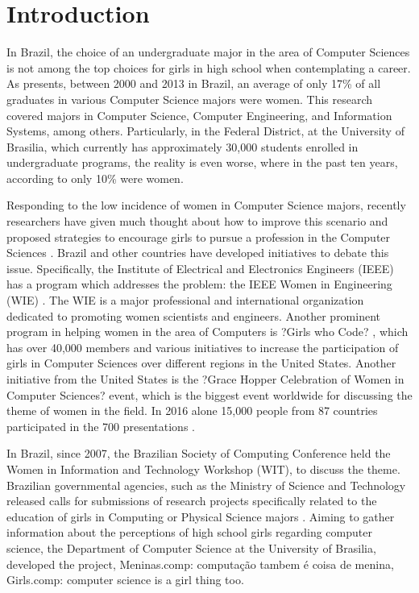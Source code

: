 \section{Introduction}\label{sec:intro}%

In Brazil, the choice of an undergraduate major in the area of Computer Sciences is not among the top choices for girls in high school when contemplating a career. As \cite{maia_2016} presents, between 2000 and 2013 in Brazil, an average of only 17\% of all graduates in various Computer Science majors were women. This research covered majors in Computer Science, Computer Engineering, and Information Systems, among others. Particularly, in the Federal District, at the University of Brasilia, which currently has approximately 30,000 students enrolled in undergraduate programs, the reality is even worse, where in the past ten years, according to \cite{couto_2014} only 10\% were women. 

    Responding to the low incidence of women in Computer Science majors, recently researchers have given much thought about how to improve this scenario and proposed strategies to encourage girls to pursue a profession in the Computer Sciences   \cite{cohoon_2002} \cite{couto_2014}  \cite{gurer_2002}  \cite{maia_2016}. Brazil and other countries have developed initiatives to debate this issue. Specifically, the Institute of Electrical and Electronics Engineers (IEEE) has a program which addresses the problem: the IEEE Women in Engineering (WIE) \cite{wie2017}. The WIE is a major professional and international organization dedicated to promoting women scientists and engineers. Another prominent program in helping women in the area of Computers is ?Girls who Code? \cite{girlsWC_2017}, which has over 40,000 members and various initiatives to increase the participation of girls in Computer Sciences over different regions in the United States. Another initiative from the United States is the ?Grace Hopper Celebration of Women in Computer Sciences? event, which is the biggest event worldwide for discussing the theme of women in the field. In 2016 alone 15,000 people from 87 countries participated in the 700 presentations \cite{GHC_2017}.
    
    In Brazil, since 2007, the Brazilian Society of Computing Conference held the Women in Information and Technology Workshop (WIT), to discuss the theme. Brazilian governmental agencies, such as the Ministry of Science and Technology released calls for submissions of research projects specifically related to the education of girls in Computing or Physical Science majors \cite{cnpq_2017}. Aiming to gather information about the perceptions of high school girls regarding computer science, the Department of Computer Science at the University of Brasilia, developed the project, Meninas.comp: computação  tambem é coisa de menina, Girls.comp: computer science is a girl thing too.  
    

